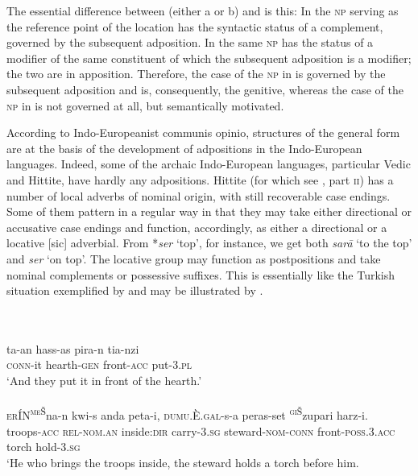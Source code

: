 The essential difference between  (either a or b) and  is this: In  the \textsc{np} serving as the reference point of the location has the syntactic status of a complement, governed by the subsequent adposition. In  the same \textsc{np} has the status of a modifier of the same constituent of which the subsequent adposition is a modifier; the two are in apposition. Therefore, the case of the \textsc{np} in  is governed by the subsequent adposition and is, consequently, the genitive, whereas the case of the \textsc{np} in  is not governed at all, but semantically motivated.

\label{page98}According to Indo-Europeanist communis opinio, structures of the general form  are at the basis of the development of adpositions in the Indo-European languages. Indeed, some of the archaic Indo-European languages, particular Vedic and Hittite, have hardly any adpositions. Hittite (for which see \citet{Starke1977}, part \textsc{ii}) has a number of local adverbs of nominal origin, with still recoverable case endings. Some of them pattern in a regular way in that they may take either directional or accusative case endings and function, accordingly, as either a directional or a locative [sic] adverbial. From *\textit{ser} ‘top’, for instance, we get both \textit{sar\=a} ‘to the top’ and \textit{ser} ‘on top’. The locative group may function as postpositions and take nominal complements or possessive suffixes. This is essentially like the Turkish situation exemplified by  and may be illustrated by .

\ea\label{ex:E68}
\langinfo{\LangHitt}{}{} \\
 \ea {} \\
 \gll  ta-an  hass-as  pira-n  tia-nzi\\
  \textsc{conn}-it  hearth-\textsc{gen}  front-\textsc{acc}  put-3.\textsc{pl}\\
\glt ‘And they put it in front of the hearth.’
 \\
\ex {}\\
\gll  \textsc{er}ÍN\textsuperscript{\textsc{me}Š}na-n  kwi-s  anda  peta-i, \textsc{dumu}.È.\textsc{gal}-s-a  peras-set  \textsuperscript{\textsc{gi}Š}zupari  harz-i.\\
   troops-\textsc{acc}  \textsc{rel}-\textsc{nom}.\textsc{an}  inside:\textsc{dir}  carry-3.\textsc{sg} steward-\textsc{nom}-\textsc{conn}  front-\textsc{poss}.3.\textsc{acc}\footnotemark{}  torch  hold-3.\textsc{sg}\\
\glt ‘He who brings the troops inside, the steward holds a torch before him.\\
 \z
 \z
 
